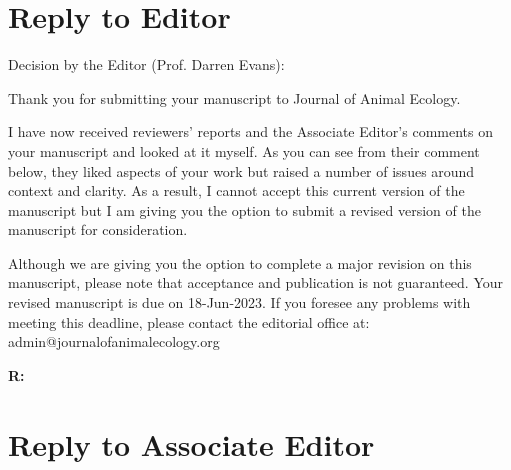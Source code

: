 \documentclass[12pt]{article}
\newenvironment{refquote}{\bigskip \begin{it}}{\end{it}\medskip}
\begin{document}

\section*{Reply to Editor}

    \begin{refquote}
        Decision by the Editor (Prof. Darren Evans):

        Thank you for submitting your manuscript to Journal of Animal Ecology.

        I have now received reviewers' reports and the Associate Editor's comments on your manuscript and looked at it myself. As you can see from their comment below, they liked aspects of your work but raised a number of issues around context and clarity. As a result, I cannot accept this current version of the manuscript but I am giving you the option to submit a revised version of the manuscript for consideration.

        Although we are giving you the option to complete a major revision on this manuscript, please note that acceptance and publication is not guaranteed. Your revised manuscript is due on 18-Jun-2023. If you foresee any problems with meeting this deadline, please contact the editorial office at: admin@journalofanimalecology.org

    \end{refquote}
    

    \textbf{R:} 


\clearpage

\section*{Reply to Associate Editor}
\end{document}
